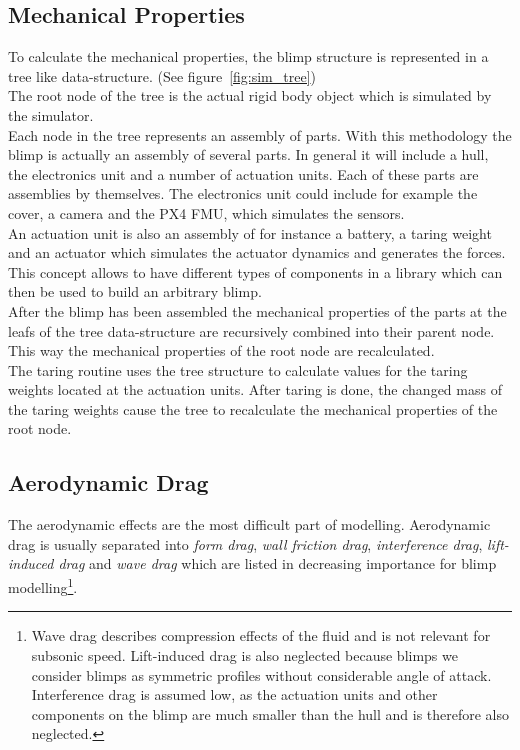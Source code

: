 \subsection{Mechanical Properties}
\label{sub:mech_properties}
To calculate the mechanical properties, the blimp structure is represented in a tree like data-structure. (See figure~\ref{fig:sim_tree})\\
The root node of the tree is the actual rigid body object which is simulated by the simulator.\\
Each node in the tree represents an assembly of parts.
With this methodology the blimp is actually an assembly of several parts. 
In general it will include a hull, the electronics unit and a number of actuation units.
Each of these parts are assemblies by themselves.
The electronics unit could include for example the cover, a camera and the PX4 FMU, which simulates the sensors.\\
An actuation unit is also an assembly of for instance a battery, a taring weight and an actuator which simulates the actuator dynamics and generates the forces.\\
This concept allows to have different types of components in a library which can then be used to build an arbitrary blimp.\\
After the blimp has been assembled the mechanical properties of the parts at the leafs of the tree data-structure are recursively combined into their parent node.
This way the mechanical properties of the root node are recalculated.\\
The taring routine uses the tree structure to calculate values for the taring weights located at the actuation units. 
After taring is done, the changed mass of the taring weights cause the tree to recalculate the mechanical properties of the root node.

\subsection{Aerodynamic Drag}
\label{sub:aero_drag}
The aerodynamic effects are the most difficult part of modelling.
Aerodynamic drag is usually separated into \textit{form drag}, \textit{wall friction drag}, \textit{interference drag}, \textit{lift-induced drag} and \textit{wave drag} which are listed in decreasing importance for blimp modelling\footnote{
Wave drag describes compression effects of the fluid and is not relevant for subsonic speed.
Lift-induced drag is also neglected because blimps we consider blimps as symmetric profiles without considerable angle of attack.
Interference drag is assumed low, as the actuation units and other components on the blimp are much smaller than the hull and is therefore also neglected.
}.

